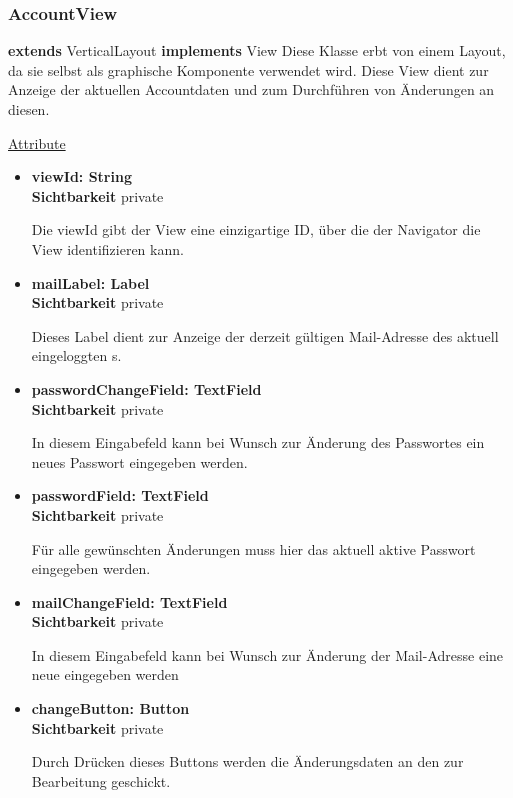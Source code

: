 \newpage
\subsubsection{AccountView}\label{AccountView}
\textbf{extends}  VerticalLayout \newline
\textbf{implements} View \newline
Diese Klasse erbt von einem Layout, da sie selbst als graphische Komponente verwendet wird. Diese View dient zur Anzeige der aktuellen Accountdaten und zum Durchführen von Änderungen an diesen.
\newline

\underline{Attribute}
\begin{itemize}
\itemsep0pt
\item \textbf{viewId: String} \hfill\\
\textbf{Sichtbarkeit} private
 
Die viewId gibt der View eine einzigartige ID, über die der Navigator die View identifizieren kann.

\item \textbf{mailLabel: Label} \hfill\\ 
\textbf{Sichtbarkeit} private

Dieses Label dient zur Anzeige der derzeit gültigen Mail-Adresse des aktuell eingeloggten s.

\item \textbf{passwordChangeField: TextField} \hfill\\ 
\textbf{Sichtbarkeit} private

In diesem Eingabefeld kann bei Wunsch zur Änderung des Passwortes ein neues Passwort eingegeben werden.

\item \textbf{passwordField: TextField} \hfill\\ 
\textbf{Sichtbarkeit} private

Für alle gewünschten Änderungen muss hier das aktuell aktive Passwort eingegeben werden.

\item \textbf{mailChangeField: TextField} \hfill\\ 
\textbf{Sichtbarkeit} private

In diesem Eingabefeld kann bei Wunsch zur Änderung der Mail-Adresse eine neue eingegeben werden

\item \textbf{changeButton: Button} \hfill\\
\textbf{Sichtbarkeit} private

Durch Drücken dieses Buttons werden die Änderungsdaten an den  zur Bearbeitung geschickt.
\end{itemize}

